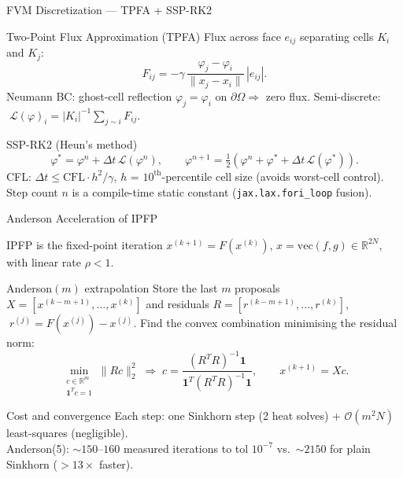\documentclass[aspectratio=169]{beamer}
\begin{document}
\begin{frame}{FVM Discretization — TPFA + SSP-RK2}

\begin{block}{Two-Point Flux Approximation (TPFA)}
Flux across face $e_{ij}$ separating cells $K_i$ and $K_j$:
\[
    F_{ij} = -\gamma\,\frac{\varphi_j - \varphi_i}{\|x_j - x_i\|}\,|e_{ij}|.
\]
Neumann BC: ghost-cell reflection $\varphi_j = \varphi_i$ on $\partial\Omega \Rightarrow$ zero flux.
Semi-discrete: $\;\mathcal{L}(\varphi)_i = |K_i|^{-1}\sum_{j\sim i} F_{ij}$.
\end{block}

\begin{block}{SSP-RK2 (Heun's method)}
\[
    \varphi^* = \varphi^n + \Delta t\,\mathcal{L}(\varphi^n), \qquad
    \varphi^{n+1} = \tfrac{1}{2}\!\left(\varphi^n + \varphi^* + \Delta t\,\mathcal{L}(\varphi^*)\right).
\]
CFL: $\Delta t \leq \mathrm{CFL}\cdot h^2/\gamma$, $h$ = $10^{\text{th}}$-percentile cell size
(avoids worst-cell control).
Step count $n$ is a compile-time static constant (\texttt{jax.lax.fori\_loop} fusion).
\end{block}

\end{frame}

\begin{frame}{Anderson Acceleration of IPFP}

IPFP is the fixed-point iteration $x^{(k+1)} = F(x^{(k)})$,\;
$x = \mathrm{vec}(f,g)\in\mathbb{R}^{2N}$, with linear rate $\rho < 1$.

\begin{block}{Anderson$(m)$ extrapolation}
Store the last $m$ proposals $X = [x^{(k-m+1)},\ldots,x^{(k)}]$ and
residuals $R = [r^{(k-m+1)},\ldots,r^{(k)}]$, $\;r^{(j)} = F(x^{(j)}) - x^{(j)}$.
Find the convex combination minimising the residual norm:
\[
    \min_{\substack{c\in\mathbb{R}^m \\ \mathbf{1}^T c=1}} \|Rc\|_2^2
    \;\Longrightarrow\;
    c = \frac{(R^TR)^{-1}\mathbf{1}}{\mathbf{1}^T(R^TR)^{-1}\mathbf{1}},
    \qquad
    x^{(k+1)} = Xc.
\]
\end{block}

\begin{block}{Cost and convergence}
Each step: one Sinkhorn step (2 heat solves) + $\mathcal{O}(m^2 N)$ least-squares (negligible).\\
Anderson(5): ${\sim}150$–$160$ measured iterations to tol $10^{-7}$ vs.\ ${\sim}2150$ for plain Sinkhorn (${>}13\times$ faster).
\end{block}

\end{frame}
\end{document}

